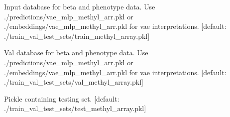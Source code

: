 \documentclass[letterpaper,10pt,english]{sphinxmanual}
\begin{document}
\begin{fulllineitems}
\label{\detokenize{index:cmdoption-methylnet-interpret-produce-shapley-data-i}}
Input database for beta and phenotype data. Use ./predictions/vae\_mlp\_methyl\_arr.pkl or ./embeddings/vae\_mlp\_methyl\_arr.pkl for vae interpretations.  {[}default: ./train\_val\_test\_sets/train\_methyl\_array.pkl{]}

\end{fulllineitems}


\begin{fulllineitems}
\label{\detokenize{index:cmdoption-methylnet-interpret-produce-shapley-data-v}}
Val database for beta and phenotype data. Use ./predictions/vae\_mlp\_methyl\_arr.pkl or ./embeddings/vae\_mlp\_methyl\_arr.pkl for vae interpretations.  {[}default: ./train\_val\_test\_sets/val\_methyl\_array.pkl{]}

\end{fulllineitems}


\begin{fulllineitems}
\label{\detokenize{index:cmdoption-methylnet-interpret-produce-shapley-data-t}}
Pickle containing testing set.  {[}default: ./train\_val\_test\_sets/test\_methyl\_array.pkl{]}

\end{fulllineitems}
\end{document}
